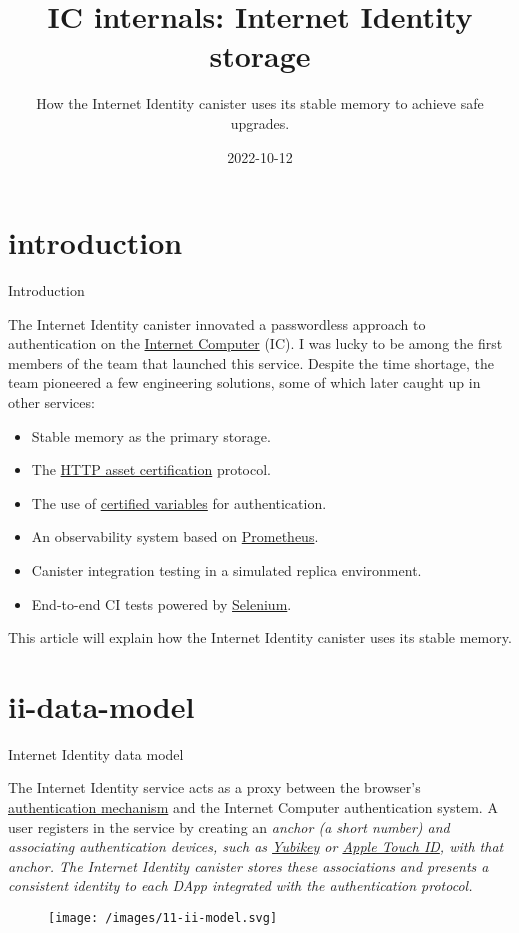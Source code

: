 \documentclass{article}
\title{IC internals: Internet Identity storage}
\subtitle{How the Internet Identity canister uses its stable memory to achieve safe upgrades.}
\date{2022-10-12}
\begin{document}
\section{introduction}{Introduction}

The Internet Identity canister innovated a passwordless approach to authentication on the \href{https://internetcomputer.org}{Internet Computer} (IC).
I was lucky to be among the first members of the team that launched this service.
Despite the time shortage, the team pioneered a few engineering solutions, some of which later caught up in other services:
\begin{itemize}
  \item Stable memory as the primary storage.
  \item The \href{https://wiki.internetcomputer.org/wiki/HTTP_asset_certification}{HTTP asset certification} protocol.
  \item The use of \href{https://internetcomputer.org/how-it-works/response-certification/}{certified variables} for authentication.
  \item An observability system based on \href{https://prometheus.io/docs/introduction/overview/}{Prometheus}.
  \item Canister integration testing in a simulated replica environment.
  \item End-to-end CI tests powered by \href{https://www.selenium.dev/}{Selenium}.
\end{itemize}

This article will explain how the Internet Identity canister uses its stable memory.

\section{ii-data-model}{Internet Identity data model}

The Internet Identity service acts as a proxy between the browser's \href{https://webauthn.io/}{authentication mechanism} and the Internet Computer authentication system.
A user registers in the service by creating an \em{anchor} (a short number) and associating authentication devices, such as \href{https://en.wikipedia.org/wiki/YubiKey}{Yubikey} or \href{https://en.wikipedia.org/wiki/Touch_ID}{Apple Touch ID}, with that anchor.
The Internet Identity canister stores these associations and presents a consistent identity to each DApp integrated with the authentication protocol.

\begin{figure}[grayscale-diagram]
  \texttt{[image: /images/11-ii-model.svg]}
\end{figure}
\end{document}
